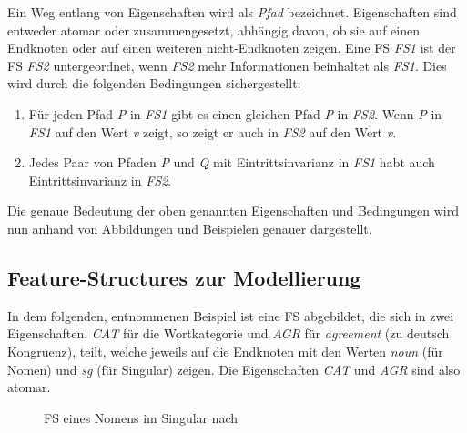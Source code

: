 \documentclass[12pt]{report}
\begin{document}
Ein Weg entlang von Eigenschaften wird als \textit{Pfad} bezeichnet. Eigenschaften sind entweder atomar oder zusammengesetzt, abhängig davon, ob sie auf einen Endknoten oder auf einen weiteren nicht-Endknoten zeigen.
Eine FS \textit{FS1} ist der FS \textit{FS2} untergeordnet, wenn \textit{FS2} mehr Informationen beinhaltet als \textit{FS1}. Dies wird durch die folgenden Bedingungen sichergestellt:

\begin{enumerate}
\item Für jeden Pfad \textit{P} in \textit{FS1} gibt es einen gleichen Pfad \textit{P} in \textit{FS2}. Wenn \textit{P} in \textit{FS1} auf den Wert \textit{v} zeigt, so zeigt er auch in \textit{FS2} auf den Wert \textit{v}.
\item Jedes Paar von Pfaden \textit{P} und \textit{Q} mit Eintrittsinvarianz in \textit{FS1} habt auch Eintrittsinvarianz in \textit{FS2}.
\end{enumerate}

Die genaue Bedeutung der oben genannten Eigenschaften und Bedingungen wird nun anhand von Abbildungen und Beispielen genauer dargestellt. 

\subsection{Feature-Structures zur Modellierung}
In dem folgenden, \cite{cop04} entnommenen Beispiel ist eine FS abgebildet, die sich in zwei Eigenschaften, \textit{\glqq  CAT\grqq{}} für die Wortkategorie und \textit{\glqq  AGR\grqq{}} für \textit{agreement} (zu deutsch \glqq  Kongruenz\grqq{}), teilt, welche jeweils auf die Endknoten mit den Werten \textit{\glqq  noun\grqq{}} (für Nomen) und \textit{\glqq  sg\grqq{}} (für Singular) zeigen. Die Eigenschaften \textit{\glqq  CAT\grqq{}} und \textit{\glqq  AGR\grqq{}} sind also atomar.

\begin{figure}[h!]
\begin{center}
\caption{FS eines Nomens im Singular nach \cite{cop04}}
\end{center}
\end{figure}
\end{document}
